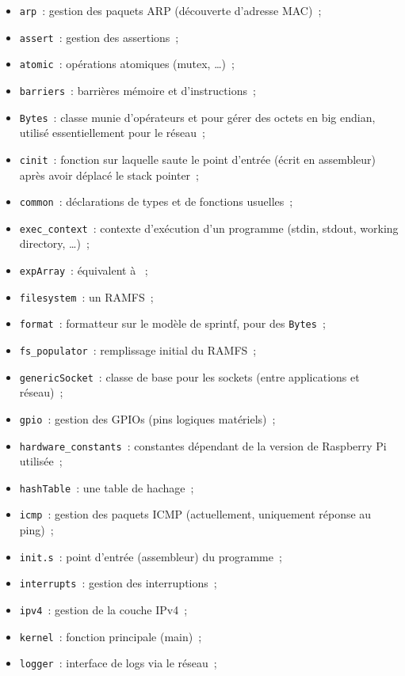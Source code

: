 \documentclass[11pt,a4paper]{article}
\newcommand{\fname}[1]{\texttt{#1}} %
\begin{document}
\begin{itemize}
	\item \fname{arp}~: gestion des paquets ARP (découverte d'adresse MAC)~;
	\item \fname{assert}~: gestion des assertions~;
	\item \fname{atomic}~: opérations atomiques (mutex, \ldots)~;
	\item \fname{barriers}~: barrières mémoire et d'instructions~;
	\item \fname{Bytes}~: classe munie d'opérateurs \lstc{<<} et \lstc{>>} pour gérer des
		octets en big endian, utilisé essentiellement pour le réseau~;
	\item \fname{cinit}~: fonction sur laquelle saute le point d'entrée
		(écrit en assembleur) après avoir déplacé le stack pointer~;
	\item \fname{common}~: déclarations de types et de fonctions usuelles~;
	\item \fname{exec\_context}~: contexte d'exécution d'un programme
		(stdin, stdout, working directory, \ldots)~;
	\item \fname{expArray}~: équivalent à ~;
	\item \fname{filesystem}~: un RAMFS~;
	\item \fname{format}~: formatteur sur le modèle de sprintf, pour des
		\fname{Bytes}~;
	\item \fname{fs\_populator}~: remplissage initial du RAMFS~;
	\item \fname{genericSocket}~: classe de base pour les sockets (entre
		applications et réseau)~;
	\item \fname{gpio}~: gestion des GPIOs (pins logiques matériels)~;
	\item \fname{hardware\_constants}~: constantes dépendant de la version
		de Raspberry Pi utilisée~;
	\item \fname{hashTable}~: une table de hachage~;
	\item \fname{icmp}~: gestion des paquets ICMP (actuellement, uniquement
		réponse au ping)~;
	\item \fname{init.s}~: point d'entrée (assembleur) du programme~;
	\item \fname{interrupts}~: gestion des interruptions~;
	\item \fname{ipv4}~: gestion de la couche IPv4~;
	\item \fname{kernel}~: fonction principale (main)~;
	\item \fname{logger}~: interface de logs via le réseau~;

\end{itemize}
\end{document}
